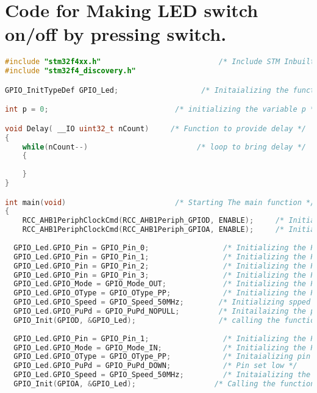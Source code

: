\section{Code for Making LED switch on/off by pressing switch.}
\begin{lstlisting}[language=C++]
#include "stm32f4xx.h"                           /* Include STM Inbuilt Library*/
#include "stm32f4_discovery.h"

GPIO_InitTypeDef GPIO_Led;                   /* Initaializing the function */

int p = 0;                             /* initializing the variable p */

void Delay( __IO uint32_t nCount)     /* Function to provide delay */
{
	while(nCount--)                         /* loop to bring delay */
	{
		
	}
}

int main(void)                         /* Starting The main function */
{
	RCC_AHB1PeriphClockCmd(RCC_AHB1Periph_GPIOD, ENABLE);     /* Initializing the clock for portD and enabling it */
	RCC_AHB1PeriphClockCmd(RCC_AHB1Periph_GPIOA, ENABLE);     /* Initializing the clock for portD and enabling it */
	
  GPIO_Led.GPIO_Pin = GPIO_Pin_0;                 /* Initializing the Pin PD0 */
  GPIO_Led.GPIO_Pin = GPIO_Pin_1;                 /* Initializing the Pin PD1 */
  GPIO_Led.GPIO_Pin = GPIO_Pin_2;                 /* Initializing the Pin PD2 */
  GPIO_Led.GPIO_Pin = GPIO_Pin_3;                 /* Initializing the Pin PD3 */
  GPIO_Led.GPIO_Mode = GPIO_Mode_OUT;             /* Initializing the Pin PD0, PD1, PD2, PD3 to work in output mode */
  GPIO_Led.GPIO_OType = GPIO_OType_PP;            /* Initializing the Pin PD0, PD1, PD2, PD3 to work in Push Pull Mode */
  GPIO_Led.GPIO_Speed = GPIO_Speed_50MHz;        /* Initializing spped of clock pulse */
  GPIO_Led.GPIO_PuPd = GPIO_PuPd_NOPULL;         /* Initailaizing the pin to work as No pull mode */
  GPIO_Init(GPIOD, &GPIO_Led);                   /* calling the function Init by passing two values */
  
  GPIO_Led.GPIO_Pin = GPIO_Pin_1;                 /* Initializing the Pin PA1 */
  GPIO_Led.GPIO_Mode = GPIO_Mode_IN;              /* Initializing the Pin PA1 to work as Input mode */
  GPIO_Led.GPIO_OType = GPIO_OType_PP;            /* Initaializing pin to work as Push pull mode */
  GPIO_Led.GPIO_PuPd = GPIO_PuPd_DOWN;            /* Pin set low */
  GPIO_Led.GPIO_Speed = GPIO_Speed_50MHz;         /* Initaializing the spped of clock pulse */
  GPIO_Init(GPIOA, &GPIO_Led);                  /* Calling the function Init by passing two values */
  

\end{lstlisting}
